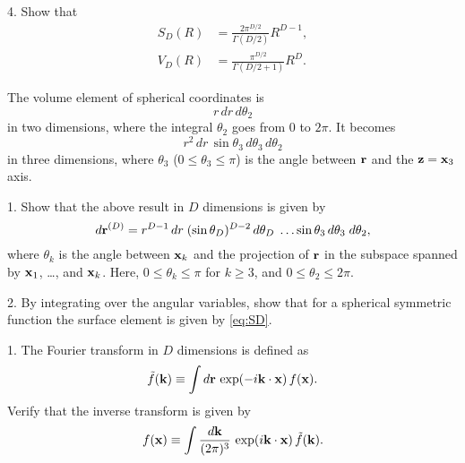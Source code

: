 \documentclass[12pt]{book}
\begin{document}
4. Show that
\begin{align}
  S_D(R) &= \frac{ 2 \pi^{D/2} } { \Gamma(D/2) } R^{D-1},
  \label{eq:SD} \\
  V_D(R) &= \frac { \pi^{D/2} } { \Gamma(D/2+1) } R^D.
  \label{eq:VD}
\end{align}








The volume element of spherical coordinates is
\[
  r \, dr \, d\theta_2
\]
in two dimensions, where the integral $\theta_2$ goes from $0$ to $2\pi$.
%
It becomes
\[
  r^2 \, dr \, 
  \sin \theta_3 \, d \theta_3 \,
  d \theta_2
\]
in three dimensions,
where $\theta_3$ ($0 \le \theta_3 \le \pi$)
is the angle between $\boldsymbol{\mathbf{r}}$ and the $\boldsymbol{\mathbf{z}} = \boldsymbol{\mathbf{x}}_3$ axis.

1. Show that the above result in $D$ dimensions is given by
\begin{equation}
  d\boldsymbol{\mathbf{r}}^{(D)}
=
  r^{D-1} \, dr \;
  (\sin \theta_D)^{D-2} \, d \theta_D \;
  \dots
  \sin \theta_3 \, d \theta_3 \;
  d \theta_2,
  \label{eq:sphrcoordiff}
\end{equation}
where $\theta_k$ is the angle between $\boldsymbol{\mathbf{x}}_k$ and
the projection of $\boldsymbol{\mathbf{r}}$ in the subspace
spanned by $\boldsymbol{\mathbf{x}}_1$, \dots, and $\boldsymbol{\mathbf{x}}_k$.
Here, $0 \le \theta_k \le \pi$ for $k \ge 3$,
and $0 \le \theta_2 \le 2\pi$.


2. By integrating over the angular variables,
show that for a spherical symmetric function
the surface element is given by \eqref{eq:SD}.





1. The Fourier transform in $D$ dimensions is defined as
\begin{equation}
  \tilde f(\boldsymbol{\mathbf{k}})
\equiv
  \int d\boldsymbol{\mathbf{r}} \, \exp(-i\boldsymbol{\mathbf{k}} \cdot \boldsymbol{\mathbf{x}}) \, f(\boldsymbol{\mathbf{x}}).
  \label{eq:FourierTransform}
\end{equation}
Verify that the inverse transform is given by
\begin{equation}
  f(\boldsymbol{\mathbf{x}})
\equiv
  \int \frac{ d \boldsymbol{\mathbf{k}} }{(2\pi)^3} \, \exp(i\boldsymbol{\mathbf{k}} \cdot \boldsymbol{\mathbf{x}}) \, \tilde f(\boldsymbol{\mathbf{k}}).
  \label{eq:inverseFourierTransform}
\end{equation}
\end{document}
